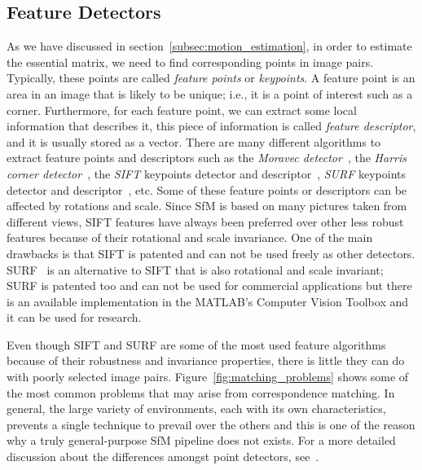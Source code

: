 \subsection{Feature Detectors}
As we have discussed in section~\ref{subsec:motion_estimation}, in order to estimate
the essential matrix, we need to find corresponding points in image pairs.
Typically, these points are called \textit{feature points} or \textit{keypoints}.
%
A feature point is an area in an image that is likely to be unique; i.e., it is a point of interest such as a corner.
%
Furthermore, for each feature point, we can extract some local information that describes it, this piece of information is called \textit{feature descriptor}, and it is usually stored as a vector.
%
There are many different algorithms to extract feature points and descriptors such as the 
\emph{Moravec detector}~\cite{moravec1980obstacle}, the \emph{Harris
corner detector}~\cite{harris1988combined}, the
\emph{SIFT} keypoints detector and descriptor~\cite{lowe1999object}, \emph{SURF} keypoints detector and descriptor~\cite{bay2006surf}, etc.
%
Some of these feature points or descriptors can be affected by rotations and scale. Since SfM is based on many pictures taken from different views, SIFT features have always been 
preferred over other less robust features because of their rotational and scale
invariance. One of the main drawbacks is that SIFT is patented and can not be used freely as other detectors.
%
SURF~\cite{bay2006surf} is an alternative to SIFT that is also
rotational and scale invariant; SURF is patented too and 
can not be used for commercial applications but there is an available 
implementation in the MATLAB's Computer Vision Toolbox and it can be 
used for research.

Even though SIFT and SURF are some of the most used feature algorithms 
because of their robustness and invariance properties, there is little they can
do with poorly selected image pairs. Figure~\ref{fig:matching_problems} shows 
some of the most common problems that may arise from correspondence matching.
In general, the large variety of environments, each with its own characteristics, 
prevents a single technique to prevail over the others and this is one of 
the reason why a truly general-purpose SfM pipeline does not exists.
For a more detailed discussion about the differences amongst point detectors, 
see~\cite{schmidt2010evaluation, govender2009evaluation}.

